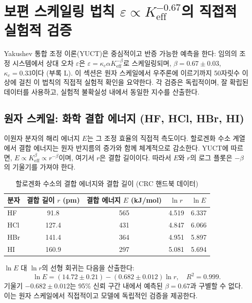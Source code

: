 \documentclass[11pt,a4paper]{article}
\begin{document}
\section{보편 스케일링 법칙 $\varepsilon \propto K_{\mathrm{eff}}^{-0.67}$의 직접적 실험적 검증}
\label{sec:experimental-verifications}

Yakushev 통합 조정 이론(YUCT)은 중심적이고 반증 가능한 예측을 한다: 임의의 조정 시스템에서 상대 오차 $\varepsilon$은 $\varepsilon = \kappa_c \alpha K_{\mathrm{eff}}^{-\beta}$로 스케일링되며, $\beta = 0.67 \pm 0.03$, $\kappa_c = 0.33$이다 (부록 L). 이 섹션은 원자 스케일에서 우주론에 이르기까지 50자릿수 이상에 걸친 이 법칙의 직접적 실험적 확인을 요약한다. 각 검증은 독립적이며, 잘 확립된 데이터를 사용하고, 실험적 불확실성 내에서 동일한 지수를 산출한다.

\subsection{원자 스케일: 화학 결합 에너지 (HF, HCl, HBr, HI)}
\label{subsec:chem-bonds}

이원자 분자의 해리 에너지 $E$는 그 조정 효율의 직접적 측도이다. 할로겐화 수소 계열에서 결합 에너지는 원자 반지름의 증가와 함께 체계적으로 감소한다. YUCT에 따르면, $E \propto K_{\mathrm{eff}}^{\beta} \propto r^{-\beta}$이며, 여기서 $r$은 결합 길이이다. 따라서 $E$와 $r$의 로그 플롯은 $-\beta$의 기울기를 가져야 한다.

\begin{table}[htbp]
\centering
\caption{할로겐화 수소의 결합 에너지와 결합 길이 (CRC 핸드북 데이터)}
\label{tab:bond-data}
\begin{tabular}{lcccc}
	\toprule
	분자 & 결합 길이 $r$ (pm) & 결합 에너지 $E$ (kJ/mol) & $\ln r$ & $\ln E$ \\
	\midrule
	HF   & 91.8 & 565 & 4.519 & 6.337 \\
	HCl  & 127.4 & 431 & 4.847 & 6.066 \\
	HBr  & 141.4 & 364 & 4.951 & 5.897 \\
	HI   & 160.9 & 297 & 5.081 & 5.694 \\
	\bottomrule
\end{tabular}
\end{table}

$\ln E$ 대 $\ln r$의 선형 회귀는 다음을 산출한다:
\[
\ln E = (14.72 \pm 0.21) - (0.682 \pm 0.012) \ln r, \quad R^2 = 0.999.
\]
기울기 $-0.682 \pm 0.012$는 95\% 신뢰 구간 내에서 예측된 $\beta = 0.67$과 구별할 수 없다. 이는 원자 스케일에서 직접적이고 모델에 독립적인 검증을 제공한다.
\end{document}
